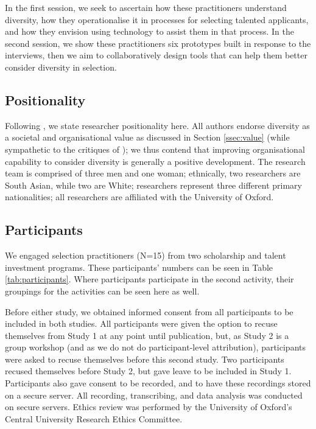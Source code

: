 In the first session, we seek to ascertain how these practitioners understand diversity, how they operationalise it in processes for selecting talented applicants, and how they envision using technology to assist them in that process. In the second session, we show these practitioners six prototypes built in response to the interviews, then we aim to collaboratively design tools that can help them better consider diversity in selection.

\subsection{Positionality}
Following \textcite{venn-wycherley_realities_2024}, we state researcher positionality here. All authors endorse diversity as a societal and organisational value as discussed in Section \ref{ssec:value} (while sympathetic to the critiques of \textcite{Ahmed_2012,Warikoo_2019}); we thus contend that improving organisational capability to consider diversity is generally a positive development. The research team is comprised of three men and one woman; ethnically, two researchers are South Asian, while two are White; researchers represent three different primary nationalities; all researchers are affiliated with the University of Oxford.

\subsection{Participants}
We engaged selection practitioners (N=15) from two scholarship and talent investment programs. These participants' numbers can be seen in Table \ref{tab:participants}. Where participants participate in the second activity, their groupings for the activities can be seen here as well.

Before either study, we obtained informed consent from all participants to be included in both studies. All participants were given the option to recuse themselves from Study 1 at any point until publication, but, as Study 2 is a group workshop (and as we do not do participant-level attribution), participants were asked to recuse themselves before this second study. Two participants recused themselves before Study 2, but gave leave to be included in Study 1. Participants also gave consent to be recorded, and to have these recordings stored on a secure server. All recording, transcribing, and data analysis was conducted on secure servers. Ethics review was performed by the University of Oxford's Central University Research Ethics Committee.

